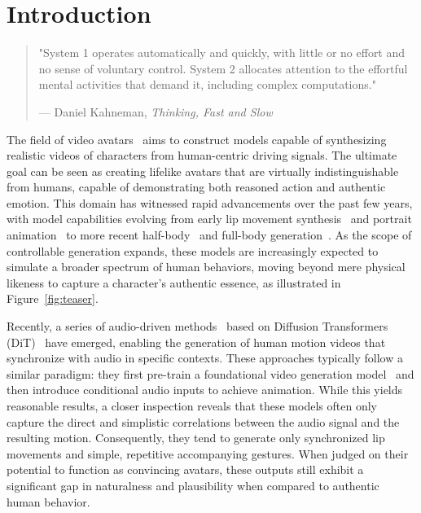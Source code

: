 \section{Introduction}\label{sec:intro}

\begin{quote}
"System 1 operates automatically and quickly, with little or no effort and no sense of voluntary control. System 2 allocates attention to the effortful mental activities that demand it, including complex computations."
\hfill\null 
\par\nopagebreak
\hfill --- Daniel Kahneman, \textit{Thinking, Fast and Slow}
\end{quote}



The field of video avatars~\cite{he2023gaia,tian2024emo,xu2024hallo,wang2024vexpress,chen2024echomimic,xu2024vasa,stypulkowski2024diffused,jiang2025loopy,lin2025cyberhost,gan2025omniavatar,kong2025multitalk,wang2025fantasytalking,hu2024animate,lin2025omnihuman,qiu2025skyreels} aims to construct models capable of synthesizing realistic videos of characters from human-centric driving signals. The ultimate goal can be seen as creating lifelike avatars that are virtually indistinguishable from humans, capable of demonstrating both reasoned action and authentic emotion. This domain has witnessed rapid advancements over the past few years, with model capabilities evolving from early lip movement synthesis~\cite{jiang2024mobileportrait,zhang2023sadtalker,facev2v,zhao2022tps,fomm,mraa} and portrait animation~\cite{jiang2025loopy,tian2024emo,fada,xu2024vasa,xu2024hallo,hallo3} to more recent half-body~\cite{lin2025cyberhost,emo2} and full-body generation~\cite{lin2025omnihuman}. As the scope of controllable generation expands, these models are increasingly expected to simulate a broader spectrum of human behaviors, moving beyond mere physical likeness to capture a character's authentic essence, as illustrated in Figure~\ref{fig:teaser}.


Recently, a series of audio-driven methods~\cite{lin2025omnihuman,kong2025multitalk,gan2025omniavatar,wang2025fantasytalking, qiu2025skyreels} based on Diffusion Transformers (DiT)~\cite{dit,esser2024sd3,seawead2025seaweed,kong2024hunyuanvideo,wan2025} have emerged, enabling the generation of human motion videos that synchronize with audio in specific contexts. These approaches typically follow a similar paradigm: they first pre-train a foundational video generation model~\cite{wan2025,seawead2025seaweed} and then introduce conditional audio inputs to achieve animation. While this yields reasonable results, a closer inspection reveals that these models often only capture the direct and simplistic correlations between the audio signal and the resulting motion. Consequently, they tend to generate only synchronized lip movements and simple, repetitive accompanying gestures. When judged on their potential to function as convincing avatars, these outputs still exhibit a significant gap in naturalness and plausibility when compared to authentic human behavior.


